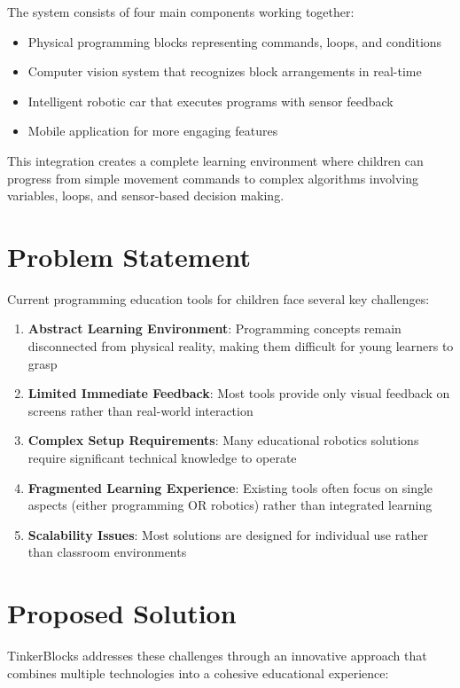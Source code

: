The system consists of four main components working together:
\begin{itemize}
    \item Physical programming blocks representing commands, loops, and conditions
    \item Computer vision system that recognizes block arrangements in real-time
    \item Intelligent robotic car that executes programs with sensor feedback
    \item Mobile application for more engaging features
\end{itemize}

This integration creates a complete learning environment where children can progress from simple movement commands to complex algorithms involving variables, loops, and sensor-based decision making.

\section{Problem Statement}

Current programming education tools for children face several key challenges:

\begin{enumerate}
    \item \textbf{Abstract Learning Environment}: Programming concepts remain disconnected from physical reality, making them difficult for young learners to grasp
    \item \textbf{Limited Immediate Feedback}: Most tools provide only visual feedback on screens rather than real-world interaction
    \item \textbf{Complex Setup Requirements}: Many educational robotics solutions require significant technical knowledge to operate
    \item \textbf{Fragmented Learning Experience}: Existing tools often focus on single aspects (either programming OR robotics) rather than integrated learning
    \item \textbf{Scalability Issues}: Most solutions are designed for individual use rather than classroom environments
\end{enumerate}

\section{Proposed Solution}

TinkerBlocks addresses these challenges through an innovative approach that combines multiple technologies into a cohesive educational experience:

